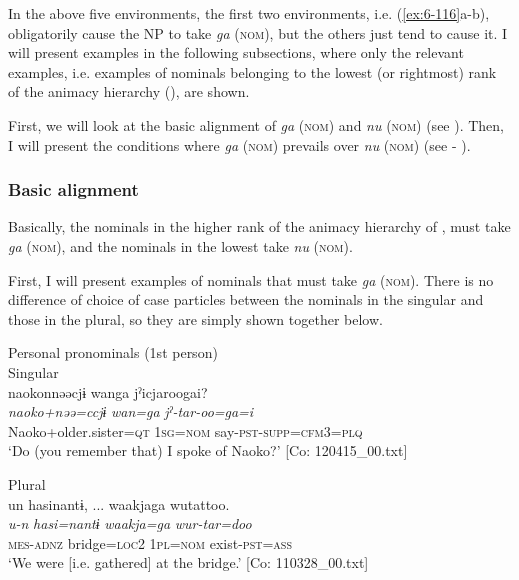 In the above five environments, the first two environments, i.e. (\ref{ex:6-116}a-b), obligatorily cause the NP to take \textit{ga} (\textsc{nom}), but the others just tend to cause it. I will present examples in the following subsections, where only the relevant examples, i.e. examples of nominals belonging to the lowest (or rightmost) rank of the animacy hierarchy (), are shown.

  First, we will look at the basic alignment of \textit{ga} (\textsc{nom}) and \textit{nu} (\textsc{nom}) (see ). Then, I will present the conditions where \textit{ga} (\textsc{nom}) prevails over \textit{nu} (\textsc{nom}) (see  - ).

\subsubsection{Basic alignment}

Basically, the nominals in the higher rank of the animacy hierarchy of , must take \textit{ga} (\textsc{nom}), and the nominals in the lowest take \textit{nu} (\textsc{nom}).

First, I will present examples of nominals that must take \textit{ga} (\textsc{nom}). There is no difference of choice of case particles between the nominals in the singular and those in the plural, so they are simply shown together below.

\ea\label{ex:6-117}
  Personal pronominals (1st person)\\
 \ea Singular\\
{\TM}
\glll  naokonnəəcjɨ  wanga  jˀicjaroogai?\\
\textit{naoko+nəə=ccjɨ}  \textit{wan=ga}  \textit{jˀ-tar-oo=ga=i}\\
Naoko+older.sister=\textsc{qt}  1\textsc{sg}=\textsc{nom}  say-\textsc{pst}-\textsc{supp}=\textsc{cfm}3=\textsc{plq}\\
\glt ‘Do (you remember that) I spoke of Naoko?’ [Co: 120415\_00.txt]

\ex Plural\\
{\TM}
\glll  un  hasinantɨ, ...  waakjaga  wutattoo.\\
\textit{u-n}  \textit{hasi=nantɨ}  \textit{waakja=ga}  \textit{wur-tar=doo}\\
\textsc{mes}-\textsc{adnz}  bridge=\textsc{loc2}  1\textsc{pl}=\textsc{nom}  exist-\textsc{pst}=\textsc{ass}\\
\glt ‘We were [i.e. gathered] at the bridge.’ [Co: 110328\_00.txt]


